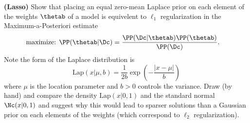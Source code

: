 \documentclass[12pt,letterpaper,fleqn]{hmcpset}
\begin{document}
\begin{problem}
\textbf{(Lasso)} Show that placing an equal zero-mean Laplace prior on each element of the weights $\thetab$
of a model is equivelent to $\ell_1$ regularization in the Maximum-a-Posteriori estimate
\begin{align*}
    \text{maximize: } & \PP(\thetab | \Dc) = \frac{\PP(\Dc | \thetab)\PP(\thetab)}{\PP(\Dc)}.
\end{align*}
Note the form of the Laplace distribution is
\[
    \mathrm{Lap}(x|\mu,b) = \frac{1}{2b}\exp\left(-\frac{|x-\mu|}{b}\right)
\]
where $\mu$ is the location parameter and $b>0$ controls the variance. Draw (by hand) and compare the density
$\mathrm{Lap}(x|0,1)$ and the standard normal $\Nc(x|0,1)$ and suggest why this would
lead to sparser solutions than a Gaussian prior on each elements of the weights
(which correspond to $\ell_2$ regularization).
\end{problem}
\begin{solution}
\vfill
\end{solution}
\end{document}
